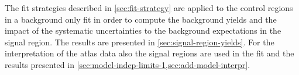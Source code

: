 The fit strategies described in \cref{sec:fit-strategy} are applied to the
control regions in a background only fit in order to compute the background
yields and the impact of the systematic uncertainties to the background
expectations in the signal region. The results are presented in
\cref{sec:signal-region-yields}. For the interpretation of the \gls{atlas} data
also the signal regions are used in the fit and the results presented in
\cref{sec:model-indep-limits-1,sec:add-model-interpr}.
